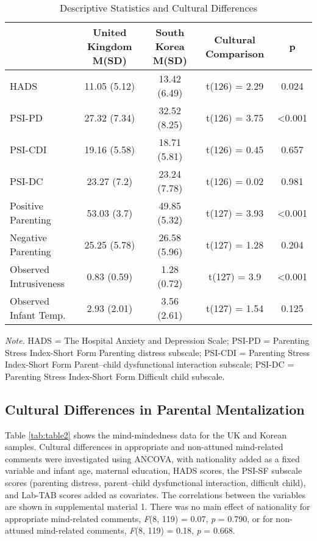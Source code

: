 \documentclass[
]{article}
\begin{document}
\begin{table}[H]

\caption{\label{tab:table1}Descriptive Statistics and Cultural Differences}
\centering
\fontsize{8}{10}\selectfont
\begin{tabular}[t]{lcccc}
\toprule
\textbf{ } & \textbf{United Kingdom M(SD)} & \textbf{South Korea M(SD)} & \textbf{Cultural Comparison} & \textbf{p}\\
\midrule
HADS & 11.05 (5.12) & 13.42 (6.49) & t(126) = 2.29 & 0.024\\
PSI-PD & 27.32 (7.34) & 32.52 (8.25) & t(126) = 3.75 & <0.001\\
PSI-CDI & 19.16 (5.58) & 18.71 (5.81) & t(126) = 0.45 & 0.657\\
PSI-DC & 23.27 (7.2) & 23.24 (7.78) & t(126) = 0.02 & 0.981\\
Positive Parenting & 53.03 (3.7) & 49.85 (5.32) & t(127) = 3.93 & <0.001\\
\addlinespace
Negative Parenting & 25.25 (5.78) & 26.58 (5.96) & t(127) = 1.28 & 0.204\\
Observed Intrusiveness & 0.83 (0.59) & 1.28 (0.72) & t(127) = 3.9 & <0.001\\
Observed Infant Temp. & 2.93 (2.01) & 3.56 (2.61) & t(127) = 1.54 & 0.125\\
\bottomrule
\end{tabular}
\end{table}

\emph{Note.} HADS = The Hospital Anxiety and Depression Scale; PSI-PD = Parenting Stress Index-Short Form Parenting distress subscale; PSI-CDI = Parenting Stress Index-Short Form Parent--child dysfunctional interaction subscale; PSI-DC = Parenting Stress Index-Short Form Difficult child subscale.

\hypertarget{cultural-differences-in-parental-mentalization}{%
\subsection*{Cultural Differences in Parental Mentalization}\label{cultural-differences-in-parental-mentalization}}

Table \ref{tab:table2} shows the mind-mindedness data for the UK and Korean samples. Cultural differences in appropriate and non-attuned mind-related comments were investigated using ANCOVA, with nationality added as a fixed variable and infant age, maternal education, HADS scores, the PSI-SF subscale scores (parenting distress, parent--child dysfunctional interaction, difficult child), and Lab-TAB scores added as covariates. The correlations between the variables are shown in supplemental material 1.
There was no main effect of nationality for appropriate mind-related comments, \emph{F}(8, 119) = 0.07, \emph{p} = 0.790,
or for non-attuned mind-related comments, \emph{F}(8, 119) = 0.18, \emph{p} = 0.668.
\end{document}
